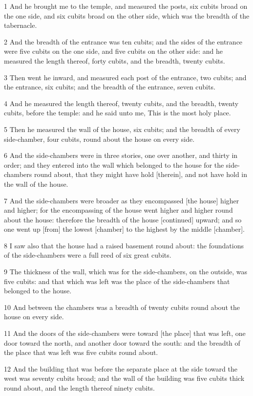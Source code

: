 \par 1 And he brought me to the temple, and measured the posts, six cubits broad on the one side, and six cubits broad on the other side, which was the breadth of the tabernacle.
\par 2 And the breadth of the entrance was ten cubits; and the sides of the entrance were five cubits on the one side, and five cubits on the other side: and he measured the length thereof, forty cubits, and the breadth, twenty cubits.
\par 3 Then went he inward, and measured each post of the entrance, two cubits; and the entrance, six cubits; and the breadth of the entrance, seven cubits.
\par 4 And he measured the length thereof, twenty cubits, and the breadth, twenty cubits, before the temple: and he said unto me, This is the most holy place.
\par 5 Then he measured the wall of the house, six cubits; and the breadth of every side-chamber, four cubits, round about the house on every side.
\par 6 And the side-chambers were in three stories, one over another, and thirty in order; and they entered into the wall which belonged to the house for the side-chambers round about, that they might have hold [therein], and not have hold in the wall of the house.
\par 7 And the side-chambers were broader as they encompassed [the house] higher and higher; for the encompassing of the house went higher and higher round about the house: therefore the breadth of the house [continued] upward; and so one went up [from] the lowest [chamber] to the highest by the middle [chamber].
\par 8 I saw also that the house had a raised basement round about: the foundations of the side-chambers were a full reed of six great cubits.
\par 9 The thickness of the wall, which was for the side-chambers, on the outside, was five cubits: and that which was left was the place of the side-chambers that belonged to the house.
\par 10 And between the chambers was a breadth of twenty cubits round about the house on every side.
\par 11 And the doors of the side-chambers were toward [the place] that was left, one door toward the north, and another door toward the south: and the breadth of the place that was left was five cubits round about.
\par 12 And the building that was before the separate place at the side toward the west was seventy cubits broad; and the wall of the building was five cubits thick round about, and the length thereof ninety cubits.
